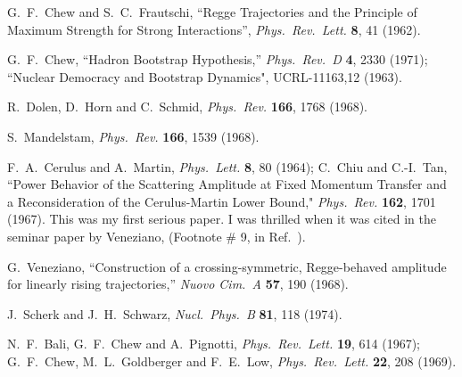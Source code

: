 \documentclass[11pt, oneside]{article}   	%
\newcommand{\<}{\langle}
\renewcommand{\>}{\rangle}
\numberwithin{equation}{section}
\numberwithin{figure}{section}
\begin{document}
\begin{thebibliography}{99}

 G.~F.~Chew and S.~C.~Frautschi,
  ``Regge Trajectories and the Principle of Maximum Strength for Strong Interactions'',
 {\it  Phys.\ Rev.\ Lett.} {\bf 8}, 41 (1962).
 



 G.~F.~Chew,
  ``Hadron Bootstrap Hypothesis,''
 {\it Phys.\ Rev.\ D} {\bf 4}, 2330 (1971); ``Nuclear Democracy and Bootstrap Dynamics", UCRL-11163,12 (1963).
  

R.~Dolen, D.~Horn and C.~Schmid,
  {\it Phys.\ Rev.} {\bf 166}, 1768 (1968).

   
  S.~Mandelstam,
  {\it Phys.\ Rev.} {\bf 166}, 1539 (1968).
  



F.~A.~Cerulus and A.~Martin,
  {\it Phys.\ Lett.} {\bf 8}, 80 (1964);
   C.~Chiu and C.-I.~Tan, 
``Power Behavior of the Scattering Amplitude at Fixed
                        Momentum Transfer and a Reconsideration of the
                        Cerulus-Martin Lower Bound," {\it Phys.\ Rev.}  {\bf 162}, 1701 (1967). This was my first serious paper.  I was thrilled when it was cited in the seminar paper by Veneziano, (Footnote \# 9, in Ref.~\cite{GV68}). %
      
 
 
  G.~Veneziano,
  ``Construction of a crossing-symmetric, Regge-behaved amplitude for linearly rising trajectories,''
  {\it Nuovo Cim.~A} {\bf 57}, 190 (1968).
  
   J.~Scherk and J.~H.~Schwarz,
{\it   Nucl.\ Phys.\ B} {\bf 81}, 118 (1974).


      
N.~F.~Bali, G.~F.~Chew and A.~Pignotti,
{\it   Phys.\ Rev.\ Lett.} {\bf 19}, 614 (1967); G.~F.~Chew, M.~L.~Goldberger and F.~E.~Low,  
 {\it Phys.\ Rev.\ Lett.} {\bf 22}, 208 (1969).



\end{thebibliography}
\end{document}
